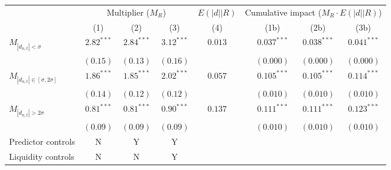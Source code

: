 \begin{tabular}{lcccccccc}
  \toprule & \multicolumn{3}{c}{Multiplier ($M_R$)} & $E(|d| | R)$ & \multicolumn{4}{c}{Cumulative impact ($M_R \cdot E(|d| | R)$)} \\
 \cmidrule(l){2-4} \cmidrule(l){5-5} \cmidrule(l){6-9} \vspace{5pt} 
  & (1) & (2) & (3) & (4) &  & (1b) & (2b) & (3b) \\ 
  $M_{|d_{n,t}| < \sigma}$ & $2.82^{***}$ & $2.84^{***}$ & $3.12^{***}$ & $0.013$ &  & $0.037^{***}$ & $0.038^{***}$ & $0.041^{***}$ \\ 
   & $(0.15)$ & $(0.13)$ & $(0.16)$ &  &  & $(0.000)$ & $(0.000)$ & $(0.000)$ \\ 
  $M_{|d_{n,t}| \in [\sigma, 2\sigma]}$ & $1.86^{***}$ & $1.85^{***}$ & $2.02^{***}$ & $0.057$ &  & $0.105^{***}$ & $0.105^{***}$ & $0.114^{***}$ \\ 
   & $(0.14)$ & $(0.12)$ & $(0.12)$ &  &  & $(0.010)$ & $(0.010)$ & $(0.010)$ \\ 
  $M_{|d_{n,t}| > 2 \sigma}$ & $0.81^{***}$ & $0.81^{***}$ & $0.90^{***}$ & $0.137$ &  & $0.111^{***}$ & $0.111^{***}$ & $0.123^{***}$ \\ 
   & $(0.09)$ & $(0.09)$ & $(0.09)$ &  &  & $(0.010)$ & $(0.010)$ & $(0.010)$ \\ 
  Predictor controls & N & Y & Y &  &  &  &  &  \\ 
  Liquidity controls & N & N & Y &  &  &  &  &  \\ 
   \bottomrule\end{tabular}

